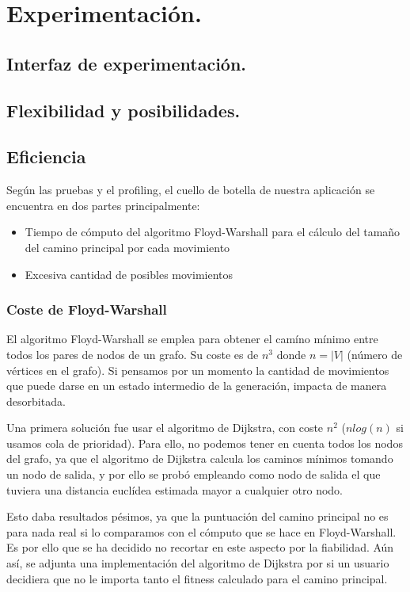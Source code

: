 \chapter{Experimentación.}\label{cap:capitulo7}


\section{Interfaz de experimentación.}


\section{Flexibilidad y posibilidades.}


\section{Eficiencia}

Según las pruebas y el profiling, el cuello de botella de nuestra aplicación se encuentra en dos partes principalmente:

\begin{itemize}
	\item Tiempo de cómputo del algoritmo Floyd-Warshall para el cálculo del tamaño del camino principal por cada movimiento
	\item Excesiva cantidad de posibles movimientos
\end{itemize}

\subsection{Coste de Floyd-Warshall}

El algoritmo Floyd-Warshall se emplea para obtener el camíno mínimo entre todos los pares de nodos de un grafo. Su coste es de $n^3$ donde $n = |V|$ (número de vértices en el grafo). Si pensamos por un momento la cantidad de movimientos que puede darse en un estado intermedio de la generación, impacta de manera desorbitada.

Una primera solución fue usar el algoritmo de Dijkstra, con coste $n^2$ ($n log(n)$ si usamos cola de prioridad). Para ello, no podemos tener en cuenta todos los nodos del grafo, ya que el algoritmo de Dijkstra calcula los caminos mínimos tomando un nodo de salida, y por ello se probó empleando como nodo de salida el que tuviera una distancia euclídea estimada mayor a cualquier otro nodo.

Esto daba resultados pésimos, ya que la puntuación del camino principal no es para nada real si lo comparamos con el cómputo que se hace en Floyd-Warshall. Es por ello que se ha decidido no recortar en este aspecto por la fiabilidad. Aún así, se adjunta una implementación del algoritmo de Dijkstra por si un usuario decidiera que no le importa tanto el fitness calculado para el camino principal.

